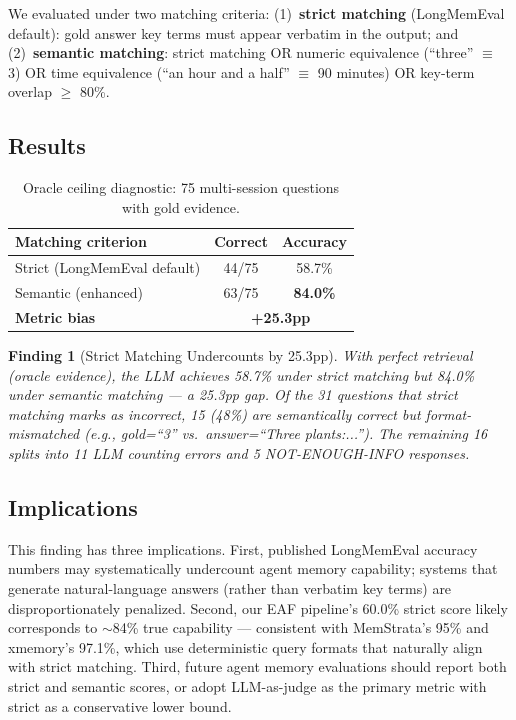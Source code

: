 \documentclass{article}
\newtheorem{finding}{Finding}
\begin{document}
We evaluated under two matching criteria: (1)~\textbf{strict matching} (LongMemEval default): gold answer key terms must appear verbatim in the output; and (2)~\textbf{semantic matching}: strict matching OR numeric equivalence (``three'' $\equiv$ 3) OR time equivalence (``an hour and a half'' $\equiv$ 90 minutes) OR key-term overlap $\geq$ 80\%.

\subsection{Results}

\begin{table}[h]
\centering
\caption{Oracle ceiling diagnostic: 75 multi-session questions with gold evidence.}
\begin{tabular}{lcc}
\toprule
Matching criterion & Correct & Accuracy \\
\midrule
Strict (LongMemEval default) & 44/75 & 58.7\% \\
Semantic (enhanced) & 63/75 & \textbf{84.0\%} \\
\midrule
\textbf{Metric bias} & \multicolumn{2}{c}{\textbf{+25.3pp}} \\
\bottomrule
\end{tabular}
\end{table}

\begin{finding}[Strict Matching Undercounts by 25.3pp]
With perfect retrieval (oracle evidence), the LLM achieves 58.7\% under strict matching but 84.0\% under semantic matching --- a 25.3pp gap. Of the 31 questions that strict matching marks as incorrect, 15 (48\%) are semantically correct but format-mismatched (e.g., gold=``3'' vs.\ answer=``Three plants:...''). The remaining 16 splits into 11 LLM counting errors and 5 NOT-ENOUGH-INFO responses.
\end{finding}

\subsection{Implications}

This finding has three implications. First, published LongMemEval accuracy numbers may systematically undercount agent memory capability; systems that generate natural-language answers (rather than verbatim key terms) are disproportionately penalized. Second, our EAF pipeline's 60.0\% strict score likely corresponds to $\sim$84\% true capability --- consistent with MemStrata's 95\% and xmemory's 97.1\%, which use deterministic query formats that naturally align with strict matching. Third, future agent memory evaluations should report both strict and semantic scores, or adopt LLM-as-judge as the primary metric with strict as a conservative lower bound.
\end{document}
